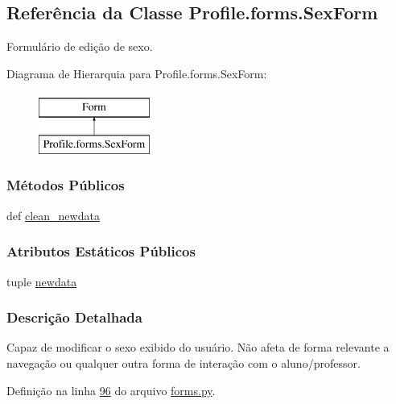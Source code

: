 \hypertarget{classProfile_1_1forms_1_1SexForm}{\subsection{Referência da Classe Profile.\-forms.\-Sex\-Form}
\label{classProfile_1_1forms_1_1SexForm}
}


Formulário de edição de sexo.  


Diagrama de Hierarquia para Profile.\-forms.\-Sex\-Form\-:\begin{figure}[H]
\begin{center}
\leavevmode
\includegraphics[height=2.000000cm]{d1/dea/classProfile_1_1forms_1_1SexForm}
\end{center}
\end{figure}
\subsubsection*{Métodos Públicos}
\begin{DoxyCompactItemize}
\item 
def \hyperlink{classProfile_1_1forms_1_1SexForm_a23eb3376f64c41fbfa57b1b78ed2a38b}{clean\-\_\-newdata}
\end{DoxyCompactItemize}
\subsubsection*{Atributos Estáticos Públicos}
\begin{DoxyCompactItemize}
\item 
tuple \hyperlink{classProfile_1_1forms_1_1SexForm_a0d99412ab99ee46149a50fabb2614845}{newdata}
\end{DoxyCompactItemize}


\subsubsection{Descrição Detalhada}
Capaz de modificar o sexo exibido do usuário. Não afeta de forma relevante a navegação ou qualquer outra forma de interação com o aluno/professor. 

Definição na linha \hyperlink{Profile_2forms_8py_source_l00096}{96} do arquivo \hyperlink{Profile_2forms_8py_source}{forms.\-py}.



